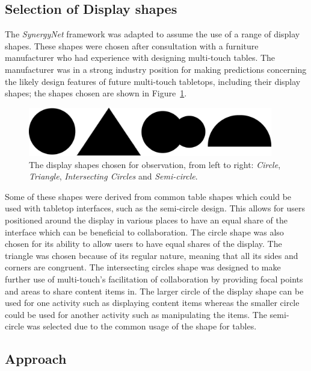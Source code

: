 \documentclass[twocolumn,compsoc]{cvm}
\begin{document}
{\subsection{Selection of Display shapes}
\label{subsec:selectionofdisplayshapes} 

The {\emph{SynergyNet}} framework was adapted to assume the use of a range of display shapes.
These shapes were chosen after consultation with a furniture manufacturer who had experience with designing multi-touch tables.
The manufacturer was in a strong industry position for making predictions concerning the likely design features of future multi-touch tabletops, including their display shapes; the shapes chosen are shown in Figure~\ref{fig:displayshapes}.

\begin{figure}[b!] 
 \centering
  \includegraphics[width=0.95\textwidth]{figures/DisplayShapes.jpeg}
  \caption{The display shapes chosen for observation, from left to right:  {\emph{Circle}}, {\emph{Triangle}}, {\emph{Intersecting Circles}} and {\emph{Semi-circle}}.}
  \label{fig:displayshapes}
\end{figure}

Some of these shapes were derived from common table shapes which could be used with tabletop interfaces, such as the semi-circle design.
This allows for users positioned around the display in various places to have an equal share of the interface which can be beneficial to collaboration.
The circle shape was also chosen for its ability to allow users to have equal shares of the display.
The triangle was chosen because of its regular nature, meaning that all its sides and corners are congruent.
The intersecting circles shape was designed to make further use of multi-touch's facilitation of collaboration by providing focal points and areas to share content items in.
The larger circle of the display shape can be used for one activity such as displaying content items whereas the smaller circle could be used for another activity such as manipulating the items.
The semi-circle was selected due to the common usage of the shape for tables.


\subsection{Approach}
\label{subsec:approach} 

}
\end{document}
